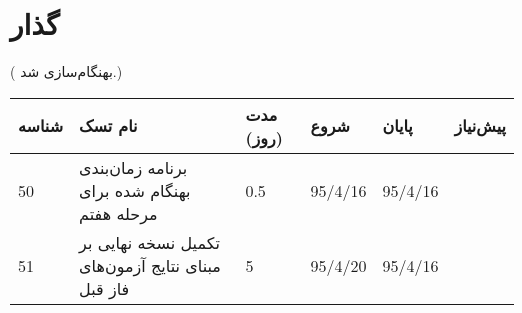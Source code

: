 \section{گذار}
({\color{red} بهنگام‌سازی شد.})

\begin{tabular}[H]{ | l | l | l | l | l | l | }
	\hline
	شناسه & نام تسک & مدت (روز) & شروع & پایان & پیش‌نیاز    \\ \hline
	50 & برنامه زمان‌بندی بهنگام شده برای مرحله هفتم & 0.5   &   95/4/16 &   95/4/16 &     \\ \hline
	51 & تکمیل نسخه نهایی بر مبنای نتایج آزمون‌های فاز قبل & 5   &   95/4/20 &   95/4/16 &     \\ \hline
	
\end{tabular}
\restoregeometry